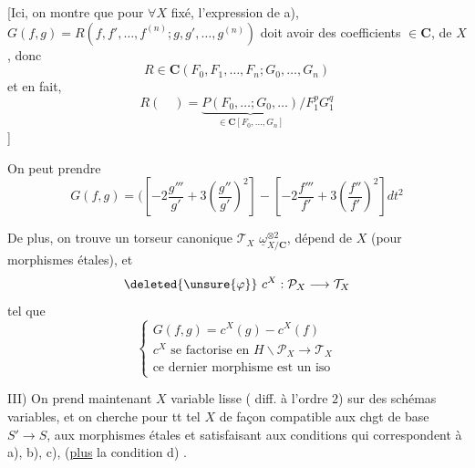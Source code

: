 [Ici, on montre que 
pour $\forall X$ fixé, l'expression de a),
$G(f,g)=R(f,f',\ldots,f^{(n)};g,g',\ldots,g^{(n)})$ doit avoir
des coefficients $\in\mathbf{C}$,  de $X$, donc
\[
R\in\mathbf{C}(F_0,F_1,\ldots,F_n;G_0,\ldots,G_n)
\]
et en fait,
\[
R(\quad)=
\underbrace{P(F_0,\ldots;G_0,\ldots)}_{\in\mathbf{C}[F_0,\ldots,G_n]}
/F_1^pG_1^q
\]
]

On peut prendre
\[
G(f,g)=\bigl(
\left[-2\frac{g'''}{g'}+3\left(\frac{g''}{g'}\right)^2\right]
-\left[-2\frac{f'''}{f'}+3\left(\frac{f''}{f'}\right)^2\right]
dt^2
\]

De plus, on trouve un torseur canonique $\mathcal{T}_X$ 
$\underline{\omega}_{X/\mathbf{C}}^{\otimes2}$,
dépend  de $X$ (pour morphismes
étales), et
\[
\deleted{\unsure{\varphi}}\ c^X:\mathcal{P}_X\longrightarrow\mathcal{T}_X
\]
tel que
\[
\left\{\begin{array}{l}
G(f,g)=c^X(g)-c^X(f)\\
c^X\text{ se factorise en }H\backslash\mathcal{P}_X\longrightarrow\mathcal{T}_X\\
\text{ce dernier morphisme est un iso}
\end{array}\right.
\]

III) On prend maintenant $X$  variable lisse
(  diff.  à l'ordre $2$)
sur des schémas variables, et on cherche pour tt tel $X$
de façon compatible aux chgt de base $S'\longrightarrow S$,
aux morphismes étales
et satisfaisant aux conditions qui correspondent à a), b), c),
(\uline{plus} la condition d) 
.


